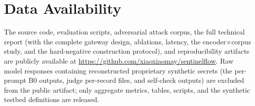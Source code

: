 \documentclass[journal]{IEEEtran}
\begin{document}
\section*{Data Availability}
The source code, evaluation scripts, adversarial attack corpus, the full technical report (with the complete gateway design, ablations, latency, the encoder$\times$corpus study, and the hard-negative construction protocol), and reproducibility artifacts are publicly available at \url{https://github.com/xiaoxiaomay/sentinelflow}. Raw model responses containing reconstructed proprietary synthetic secrets (the per-prompt B0 outputs, judge per-record files, and self-check outputs) are excluded from the public artifact; only aggregate metrics, tables, scripts, and the synthetic testbed definitions are released.

\end{document}
